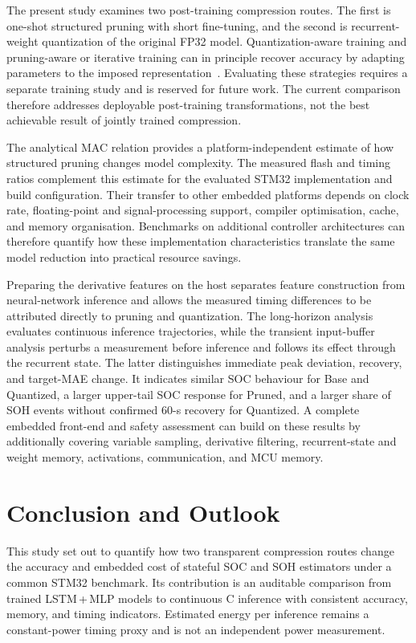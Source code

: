\documentclass[review]{elsarticle}
\begin{document}
The present study examines two post-training compression routes. The first is one-shot structured pruning with short fine-tuning, and the second is recurrent-weight quantization of the original FP32 model. Quantization-aware training and pruning-aware or iterative training can in principle recover accuracy by adapting parameters to the imposed representation~\cite{krishnamoorthiQuantizingDeepConvolutional2018,wenLearningIntrinsicSparse2017}. Evaluating these strategies requires a separate training study and is reserved for future work. The current comparison therefore addresses deployable post-training transformations, not the best achievable result of jointly trained compression.

The analytical MAC relation provides a platform-independent estimate of how structured pruning changes model complexity. The measured flash and timing ratios complement this estimate for the evaluated STM32 implementation and build configuration. Their transfer to other embedded platforms depends on clock rate, floating-point and signal-processing support, compiler optimisation, cache, and memory organisation. Benchmarks on additional controller architectures can therefore quantify how these implementation characteristics translate the same model reduction into practical resource savings.

Preparing the derivative features on the host separates feature construction from neural-network inference and allows the measured timing differences to be attributed directly to pruning and quantization. The long-horizon analysis evaluates continuous inference trajectories, while the transient input-buffer analysis perturbs a measurement before inference and follows its effect through the recurrent state. The latter distinguishes immediate peak deviation, recovery, and target-MAE change. It indicates similar SOC behaviour for Base and Quantized, a larger upper-tail SOC response for Pruned, and a larger share of SOH events without confirmed 60-s recovery for Quantized. A complete embedded front-end and safety assessment can build on these results by additionally covering variable sampling, derivative filtering, recurrent-state and weight memory, activations, communication, and MCU memory.
\section{Conclusion and Outlook}
This study set out to quantify how two transparent compression routes change the accuracy and embedded cost of stateful SOC and SOH estimators under a common STM32 benchmark. Its contribution is an auditable comparison from trained LSTM\,+\,MLP models to continuous C inference with consistent accuracy, memory, and timing indicators. Estimated energy per inference remains a constant-power timing proxy and is not an independent power measurement.
\end{document}
